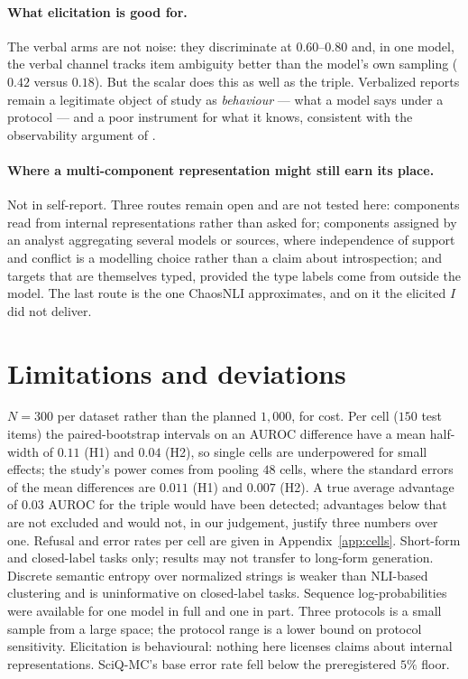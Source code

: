 \documentclass[11pt]{article}
\begin{document}
\paragraph{What elicitation is good for.} The verbal arms are not noise: they discriminate at
$0.60$--$0.80$ and, in one model, the verbal channel tracks item ambiguity better than the model's
own sampling ($0.42$ versus $0.18$). But the scalar does this as well as the triple. Verbalized
reports remain a legitimate object of study as \emph{behaviour} --- what a model says under a
protocol --- and a poor instrument for what it knows, consistent with the observability argument
of \citet{mason2026observability}.

\paragraph{Where a multi-component representation might still earn its place.} Not in
self-report. Three routes remain open and are not tested here: components read from internal
representations rather than asked for; components assigned by an analyst aggregating several
models or sources, where independence of support and conflict is a modelling choice rather than a
claim about introspection; and targets that are themselves typed, provided the type labels come
from outside the model. The last route is the one ChaosNLI approximates, and on it the elicited
$I$ did not deliver.

\section{Limitations and deviations}
\label{sec:limits}

$N=300$ per dataset rather than the planned $1{,}000$, for cost. Per cell ($150$ test items)
the paired-bootstrap intervals on an AUROC difference have a mean half-width of $0.11$ (H1) and
$0.04$ (H2), so single cells are underpowered for small effects; the study's power comes from
pooling $48$ cells, where the standard errors of the mean differences are $0.011$ (H1) and
$0.007$ (H2). A true average advantage of $0.03$ AUROC for the triple would have been detected;
advantages below that are not excluded and would not, in our judgement, justify three numbers over
one. Refusal and error rates per cell are given in Appendix~\ref{app:cells}. Short-form and closed-label tasks only; results may not transfer to long-form
generation. Discrete semantic entropy over normalized strings is weaker than NLI-based
clustering and is uninformative on closed-label tasks. Sequence log-probabilities were available
for one model in full and one in part. Three protocols is a small sample from a large space; the
protocol range is a lower bound on protocol sensitivity. Elicitation is behavioural: nothing here
licenses claims about internal representations. SciQ-MC's base error rate fell below the
preregistered $5\%$ floor.
\end{document}
